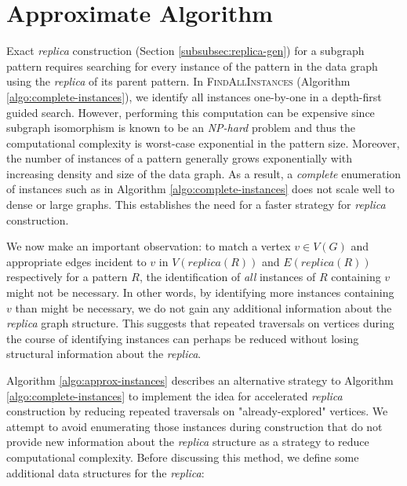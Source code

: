 \chapter{Approximate Algorithm}
\label{sec:approx_algo}
Exact \textit{replica} construction (Section \ref{subsubsec:replica-gen}) for a
subgraph pattern requires searching for every instance of the pattern in the
data graph using the \textit{replica} of its parent pattern. In
\textsc{FindAllInstances} (Algorithm \ref{algo:complete-instances}), we identify
all instances one-by-one in a depth-first guided search. However, performing
this computation can be expensive since subgraph isomorphism is known to be an
\textit{NP-hard} problem and thus the computational complexity is worst-case
exponential in the pattern size. Moreover, the number of instances of a pattern
generally grows exponentially with increasing density and size of the data
graph. As a result, a \emph{complete} enumeration of instances such as in
Algorithm \ref{algo:complete-instances} does not scale well to dense or large
graphs. This establishes the need for a faster strategy for \textit{replica}
construction.

We now make an important observation: to match a vertex $v\in V(G)$ and
appropriate edges incident to $v$ in $V(replica(R))$  and $E(replica(R))$
respectively for a pattern $R$, the identification of \textit{all} instances of
$R$ containing $v$ might not be necessary. In other words, by identifying more
instances containing $v$ than might be necessary, we do not gain any additional
information about the \textit{replica} graph structure. This suggests that
repeated traversals on vertices during the course of identifying instances can
perhaps be reduced without losing structural information about the
\textit{replica}.

Algorithm \ref{algo:approx-instances} describes an alternative strategy to
Algorithm \ref{algo:complete-instances} to implement the idea for accelerated
\textit{replica} construction by reducing repeated traversals on
"already-explored" vertices. We attempt to avoid enumerating those instances
during construction that do not provide new information about the \emph{replica}
structure as a strategy to reduce computational complexity. Before discussing
this method, we define some additional data structures for the \textit{replica}:

